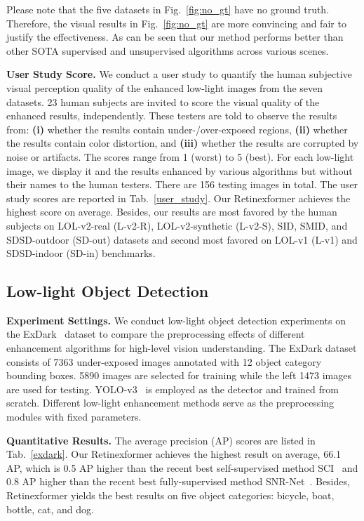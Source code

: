 \documentclass[10pt,twocolumn,letterpaper]{article}
\begin{document}
Please note that the five datasets in Fig.~\ref{fig:no_gt} have no ground truth. Therefore, the visual results in Fig.~\ref{fig:no_gt} are more convincing and fair to justify the effectiveness. As can be seen that our method performs better than other SOTA supervised and unsupervised algorithms across various scenes.

\vspace{1mm}
\noindent\textbf{User Study Score.} We conduct a user study to quantify the human subjective visual perception quality of the enhanced low-light images from the seven datasets. 23 human subjects are invited to score the visual quality of the enhanced results, independently. These testers are told to observe the results from: \textbf{(i)} whether the results contain under-/over-exposed regions, \textbf{(ii)} whether the results contain color distortion, and \textbf{(iii)} whether the results are corrupted by noise or artifacts. The scores range from 1 (worst) to 5 (best). For each low-light image, we display it and the results enhanced by various algorithms but without their names to the human testers. There are 156 testing images in total. The user study scores are reported in Tab.~\ref{user_study}. Our Retinexformer achieves the highest score on average. Besides, our results are  most favored by the human subjects on LOL-v2-real (L-v2-R), LOL-v2-synthetic (L-v2-S), SID, SMID, and SDSD-outdoor (SD-out) datasets and second most favored on LOL-v1 (L-v1) and SDSD-indoor (SD-in) benchmarks.

\vspace{-0.5mm}
\subsection{Low-light Object Detection}
\vspace{-0.5mm}
\noindent\textbf{Experiment Settings.} We conduct low-light object detection experiments on the ExDark~\cite{exdark} dataset to compare the preprocessing  effects of different enhancement algorithms for high-level vision understanding. The ExDark dataset consists of 7363 under-exposed images annotated with 12 object category bounding boxes. 5890 images are selected for training while the left 1473 images are used for testing. YOLO-v3~\cite{yolov3} is employed as the detector and trained from scratch. Different low-light enhancement methods serve as the preprocessing modules with fixed parameters. 

\vspace{0.5mm}
\noindent\textbf{Quantitative Results.} The average precision (AP) scores are listed  in Tab.~\ref{exdark}. Our Retinexformer achieves the highest  result on average, 66.1 AP, which is 0.5 AP higher than the recent best self-supervised method SCI~\cite{sci} and  0.8 AP higher than the recent best fully-supervised method SNR-Net~\cite{snr_net}. Besides, Retinexformer yields the best results on five object categories: bicycle, boat, bottle, cat, and dog.  
\end{document}
